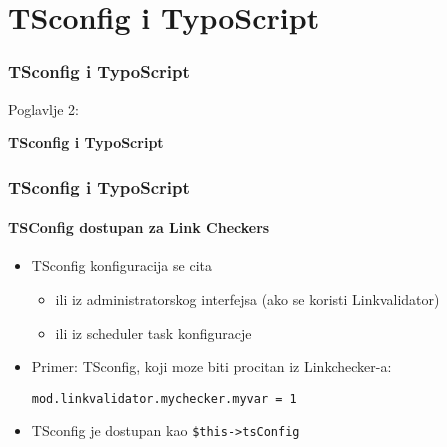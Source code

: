 %

\section{TSconfig i TypoScript}
\begin{frame}[fragile]
	\frametitle{TSconfig i TypoScript}

	\begin{center}\huge{Poglavlje 2:}\end{center}
	\begin{center}\huge{\color{typo3darkgrey}\textbf{TSconfig i TypoScript}}\end{center}

\end{frame}


\begin{frame}[fragile]
	\frametitle{TSconfig i TypoScript}
	\framesubtitle{TSConfig dostupan za Link Checkers}

	\begin{itemize}
		\item TSconfig konfiguracija se cita

			\begin{itemize}
				\item ili iz administratorskog interfejsa (ako se koristi Linkvalidator)
				\item ili iz scheduler task konfiguracje 
			\end{itemize}

		\item Primer: TSconfig, koji moze biti procitan iz Linkchecker-a:

			\lstinline!mod.linkvalidator.mychecker.myvar = 1!

		\item TSconfig je dostupan kao \texttt{\$this->tsConfig}
	\end{itemize}

\end{frame}

